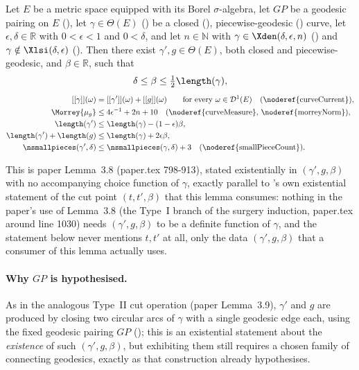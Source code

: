 \begin{lemma}
  \label{cut-type-I}
  Let $E$ be a metric space equipped with its Borel $\sigma$-algebra, let $GP$ be a geodesic
  pairing on $E$ (), let $\gamma \in \Theta(E)$ () be a
  closed (), piecewise-geodesic () curve, let
  $\epsilon,\delta \in \mathbb{R}$ with $0<\epsilon<1$ and $0<\delta$, and let $n \in \mathbb{N}$
  with $\gamma \in \Xden(\delta,\epsilon,n)$ () and $\gamma \notin
  \Xlsi(\delta,\epsilon)$ (). Then there exist $\gamma',g \in \Theta(E)$, both
  closed and piecewise-geodesic, and $\beta \in \mathbb{R}$, such that
  \[
    \delta \le \beta \le \tfrac12\length(\gamma)
    ,
  \]
  \begin{align}
    \label{eq:SameSumTypeI}
    [[\gamma]](\omega) &= [[\gamma']](\omega) + [[g]](\omega) \qquad \text{for every }\omega \in
    \mathcal{D}^1(E) \quad \text{(\noderef{curveCurrent})}, \\
    \label{eq:MorreyTypeI}
    \Morrey{\mu_g} &\le 4\epsilon^{-1}+2n+10 \quad\text{(\noderef{curveMeasure},
    \noderef{morreyNorm})}, \\
    \label{eq:LengthBoundTypeIgamma}
    \length(\gamma') &\le \length(\gamma) - (1-\epsilon)\beta , \\
    \label{eq:LengthBoundTypeItotal}
    \length(\gamma')+\length(g) &\le \length(\gamma) + 2\epsilon\beta , \\
    \label{eq:SmallCountBoundTypeI}
    \nsmallpieces(\gamma',\delta) &\le \nsmallpieces(\gamma,\delta) + 3 \quad
    \text{(\noderef{smallPieceCount})} .
  \end{align}

  This is paper Lemma~3.8 (paper.tex 798-913), stated existentially in $(\gamma',g,\beta)$ with no
  accompanying choice function of $\gamma$, exactly parallel to 's own
  existential statement of the cut point $(t,t',\beta)$ that this lemma consumes: nothing in the
  paper's use of Lemma~3.8 (the Type~I branch of the surgery induction, paper.tex around line 1030)
  needs $(\gamma',g,\beta)$ to be a definite function of $\gamma$, and the statement below never
  mentions $t,t'$ at all, only the data $(\gamma',g,\beta)$ that a consumer of this lemma actually
  uses.

  \paragraph{Why $GP$ is hypothesised.} As in the analogous Type~II cut operation (paper
  Lemma~3.9), $\gamma'$ and $g$ are produced by closing two circular arcs of $\gamma$
  with a single geodesic edge each, using the fixed geodesic pairing $GP$ (); this
  is an existential statement about the \emph{existence} of such $(\gamma',g,\beta)$, but exhibiting
  them still requires a chosen family of connecting geodesics, exactly as that construction already
  hypothesises.


\end{lemma}
